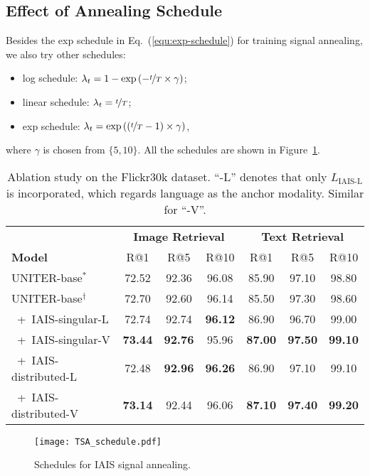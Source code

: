 \documentclass[11pt,a4paper]{article}
\begin{document}
\subsection{Effect of Annealing Schedule}
Besides the exp schedule in Eq.~(\ref{equ:exp-schedule}) for training signal annealing, we also try other schedules: 
\begin{itemize}
    \item log schedule: $\lambda_t = 1-\exp\left(-\nicefrac{t}{T}\times\gamma \right)$;
    \item linear schedule: $\lambda_t = \nicefrac{t}{T}$;
    \item exp schedule: $\lambda_t = \exp\left( \left(\nicefrac{t}{T} - 1\right) \times\gamma \right)$,
\end{itemize}
\noindent where $\gamma$ is chosen from $\{5,10\}$.
All the schedules are shown in Figure~\ref{fig:tsa-schedule}. 
\begin{table}[t!]
\begin{adjustbox}{max width=0.48\textwidth}
\begin{tabular}{lcccccc}
\toprule
               & \multicolumn{3}{c}{\textbf{Image Retrieval}} & \multicolumn{3}{c}{\textbf{Text Retrieval}} \\ \cmidrule(lr){2-4} \cmidrule(lr){5-7} 
\textbf{Model} & R@1   & R@5   & R@10                         & R@1           & R@5          & R@10         \\ \midrule
UNITER-base$^*$    & 72.52 & 92.36 & 96.08                        & 85.90         & 97.10        & 98.80        \\
UNITER-base$^\dagger$    & 72.70 & 92.60 & 96.14 & 85.50         & 97.30        & 98.60        \\ \midrule
~+~IAIS-singular-L    & 72.74 & 92.74 & \textbf{96.12}                        & 86.90         & 96.70        & 99.00        \\
~+~IAIS-singular-V    & \textbf{73.44} & \textbf{92.76} & 95.96                        & \textbf{87.00}  & \textbf{97.50}  & \textbf{99.10}        \\ \midrule
~+~IAIS-distributed-L    & 72.48 & \textbf{92.96} & \textbf{96.26}                        & 86.90         & 97.10        & 99.10        \\
~+~IAIS-distributed-V    & \textbf{73.14} & 92.44 & 96.06                        & \textbf{87.10}  & \textbf{97.40}  & \textbf{99.20}        \\ \bottomrule
\end{tabular}
\end{adjustbox}
\caption{Ablation study on the Flickr30k dataset. ``-L'' denotes that only $L_\text{IAIS-L}$ is incorporated, which regards language as the anchor modality. Similar for ``-V''.}
\label{tb:ablation-study}
\end{table} \begin{figure}[t!]
    \centering
    \texttt{[image: TSA\_schedule.pdf]}
    \caption{Schedules for IAIS signal annealing.}
    \label{fig:tsa-schedule}
\end{figure}
\end{document}
